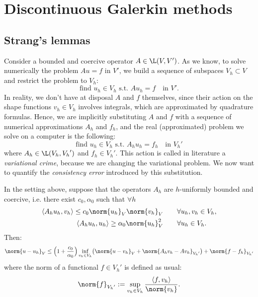 
\chapter{Discontinuous Galerkin methods}

\section{Strang's lemmas}
Consider a bounded and coercive operator $A \in \L(V,V')$. As we know, to solve numerically the problem $A u = f$ in $V'$, we build a sequence of subspaces $V_h \subset V$ and restrict the problem to $V_h$:
\[
\text{find $u_h \in V_h$ s.t. } A u_h = f \quad \text{in $V'$}.
\]
In reality, we don't have at disposal $A$ and $f$ themselves, since their action on the shape functions $v_h \in V_h$ involves integrals, which are approximated by quadrature formulas. Hence, we are implicitly substituting $A$ and $f$ with a sequence of numerical approximations $A_h$ and $f_h$, and the real (approximated) problem we solve on a computer is the following:
\[
\text{find $u_h \in V_h$ s.t. } A_h u_h = f_h \quad \text{in ${V_h}'$}
\]
where $A_h \in \L(V_h,{V_h}')$ and $f_h \in {V_h}'$. This action is called in literature a \emph{variational crime}, because we are changing the variational problem. We now want to quantify the \emph{consistency error} introduced by this substitution.

\begin{lemma}
In the setting above, suppose that the operators $A_h$ are $h$-uniformly bounded and coercive, i.e. there exist $c_0, \alpha_0$ such that $\forall h$
\begin{align}
\langle A_h u_h, v_h \rangle \le c_0 \norm{u_h}_V \norm{v_h}_V \qquad &\forall u_h,v_h \in V_h, \\
\langle A_h u_h, u_h \rangle \ge \alpha_0 \norm{u_h}_V^2 \qquad &\forall u_h \in V_h.
\end{align}
Then:
\[
\norm{u-u_h}_V \le \Bigl( 1+\frac{c_0}{\alpha_0} \Bigr) \inf_{v_h \in V_h} \bigl( \norm{u-v_h}_V + 
\norm{A_h v_h - A v_h}_{{V_h}'} \bigr) + \norm{f-f_h}_{{V_h}'}
\]
where the norm of a functional $f \in V_h'$ is defined as usual:
\[
\norm{f}_{{V_h}'} := \sup_{v_h \in V_h} \frac{\langle f, v_h \rangle}{\norm{v_h}}.
\]
\end{lemma}

